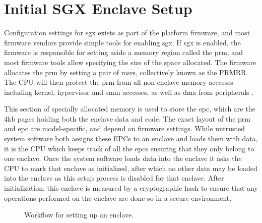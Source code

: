 \section{Initial SGX Enclave Setup}
Configuration settings for \gls{sgx} exists as part of the platform firmware, and most firmware vendors provide simple tools for enabling \gls{sgx}. If \gls{sgx} is enabled, the firmware is responsible for setting aside a memory region called the \gls{prm}, and most firmware tools allow specifying the size of the space allocated. The firmware allocates the \gls{prm} by setting a pair of \glspl{msr}, collectively known as the PRMRR. The CPU will then protect the \gls{prm} from all non-enclave memory accesses including kernel, hypervisor and \gls{smm} accesses, as well as \gls{dma} from peripherals \cite{Costan2016IntelSE}. 

This section of specially allocated memory is used to store the \gls{epc}, which are the 4kb pages holding both the enclave data and code. The exact layout of the \gls{prm} and \gls{epc} are model-specific, and depend on firmware settings. While untrusted system software both assigns these EPCs to an enclave and loads them with data, it is the CPU which keeps track of all the \gls{epc}s ensuring that they only belong to one enclave. Once the system software loads data into the enclave it asks the CPU to mark that enclave as initialized, after which no other data may be loaded into the enclave as this setup process is disabled for that enclave. After initialization, this enclave is measured by a cryptographic hash to ensure that any operations performed on the enclave are done so in a secure environment.
\vspace{10 mm}
\begin{figure}[h]
\centering
{}

\caption[Setting Up SGX]{Workflow for setting up an enclave.}
\label{fig:sgx_setup}
\end{figure}

